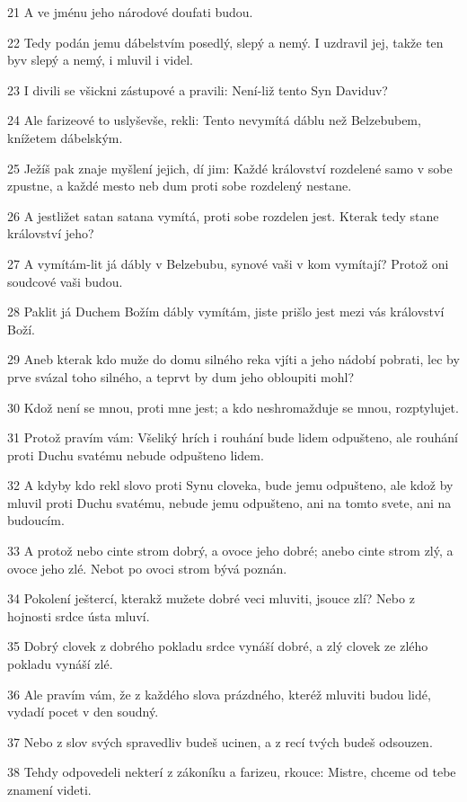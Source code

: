 \par 21 A ve jménu jeho národové doufati budou.
\par 22 Tedy podán jemu dábelstvím posedlý, slepý a nemý. I uzdravil jej, takže ten byv slepý a nemý, i mluvil i videl.
\par 23 I divili se všickni zástupové a pravili: Není-liž tento Syn Daviduv?
\par 24 Ale farizeové to uslyševše, rekli: Tento nevymítá dáblu než Belzebubem, knížetem dábelským.
\par 25 Ježíš pak znaje myšlení jejich, dí jim: Každé království rozdelené samo v sobe zpustne, a každé mesto neb dum proti sobe rozdelený nestane.
\par 26 A jestližet satan satana vymítá, proti sobe rozdelen jest. Kterak tedy stane království jeho?
\par 27 A vymítám-lit já dábly v Belzebubu, synové vaši v kom vymítají? Protož oni soudcové vaši budou.
\par 28 Paklit já Duchem Božím dábly vymítám, jiste prišlo jest mezi vás království Boží.
\par 29 Aneb kterak kdo muže do domu silného reka vjíti a jeho nádobí pobrati, lec by prve svázal toho silného, a teprvt by dum jeho obloupiti mohl?
\par 30 Kdož není se mnou, proti mne jest; a kdo neshromažduje se mnou, rozptylujet.
\par 31 Protož pravím vám: Všeliký hrích i rouhání bude lidem odpušteno, ale rouhání proti Duchu svatému nebude odpušteno lidem.
\par 32 A kdyby kdo rekl slovo proti Synu cloveka, bude jemu odpušteno, ale kdož by mluvil proti Duchu svatému, nebude jemu odpušteno, ani na tomto svete, ani na budoucím.
\par 33 A protož nebo cinte strom dobrý, a ovoce jeho dobré; anebo cinte strom zlý, a ovoce jeho zlé. Nebot po ovoci strom bývá poznán.
\par 34 Pokolení ještercí, kterakž mužete dobré veci mluviti, jsouce zlí? Nebo z hojnosti srdce ústa mluví.
\par 35 Dobrý clovek z dobrého pokladu srdce vynáší dobré, a zlý clovek ze zlého pokladu vynáší zlé.
\par 36 Ale pravím vám, že z každého slova prázdného, kteréž mluviti budou lidé, vydadí pocet v den soudný.
\par 37 Nebo z slov svých spravedliv budeš ucinen, a z recí tvých budeš odsouzen.
\par 38 Tehdy odpovedeli nekterí z zákoníku a farizeu, rkouce: Mistre, chceme od tebe znamení videti.
